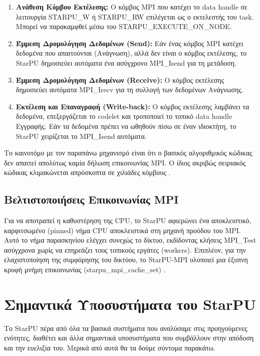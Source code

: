 \begin{enumerate}
  \item \textbf{Ανάθεση Κόμβου Εκτέλεσης:} Ο κόμβος MPI που κατέχει το data handle σε λειτουργία STARPU\_W ή STARPU\_RW επιλέγεται ως ο εκτελεστής του task. Μπορεί να παρακαμφθεί μέσω του STARPU\_EXECUTE\_ON\_NODE.
  \item \textbf{Έμμεση Δρομολόγηση Δεδομένων (Send):} Εάν ένας κόμβος MPI κατέχει δεδομένα που απαιτούνται (Ανάγνωση), αλλά δεν είναι ο κόμβος εκτέλεσης, το StarPU δημοσιεύει αυτόματα ένα ασύγχρονο MPI\_Isend για τη μετάδοση.
  \item \textbf{Έμμεση Δρομολόγηση Δεδομένων (Receive):} Ο κόμβος εκτέλεσης δημοσιεύει αυτόματα MPI\_Irecv για τη συλλογή των δεδομένων Ανάγνωσης.
  \item \textbf{Εκτέλεση και Επαναγραφή (Write-back):} Ο κόμβος εκτέλεσης λαμβάνει τα δεδομένα, επεξεργάζεται το codelet και τροποποιεί το τοπικό data handle Εγγραφής. Εάν τα δεδομένα πρέπει να ωθηθούν πίσω σε έναν ιδιοκτήτη, το StarPU χειρίζεται το MPI\_Isend αυτόματα.
\end{enumerate}

Το καινοτόμο με τον παραπάνω μηχανισμό είναι ότι ο βασικός αλγοριθμικός κώδικας δεν απαιτεί απολύτως καμία δήλωση επικοινωνίας MPI. Ο ίδιος ακριβώς σειριακός κώδικας κλιμακώνεται απρόσκοπτα σε χιλιάδες κόμβους \cite{starpu2025handbook}.

\subsection{Βελτιστοποιήσεις Επικοινωνίας MPI}

Για να αποτραπεί η καθυστέρηση της CPU, το StarPU αφιερώνει ένα αποκλειστικό, καρφιτσωμένο (pinned) νήμα CPU αποκλειστικά στη μηχανή προόδου του MPI. Αυτό το νήμα παρασκηνίου ελέγχει συνεχώς το δίκτυο, εκδίδοντας κλήσεις MPI\_Test ασύγχρονα χωρίς να επηρεάζει τους τοπικούς εργάτες (workers). Επιπλέον, για την ελαχιστοποίηση της συμφόρησης του δικτύου, το StarPU-MPI υλοποιεί μια έξυπνη κρυφή μνήμη επικοινωνίας (starpu\_mpi\_cache\_set) \cite{starpu2025handbook}. 

\section{Σημαντικά Υποσυστήματα του StarPU}

Το StarPU πέρα από όλα τα βασικά συστήματα που αναλύσαμε στις προηγούμενες ενότητες, διαθέτει και άλλα σημαντικά υποσυστήματα που συμβάλλουν στην απόδοση και την ευελιξία του. Μερικά από αυτά θα τα δούμε σύντομα παρακάτω.

